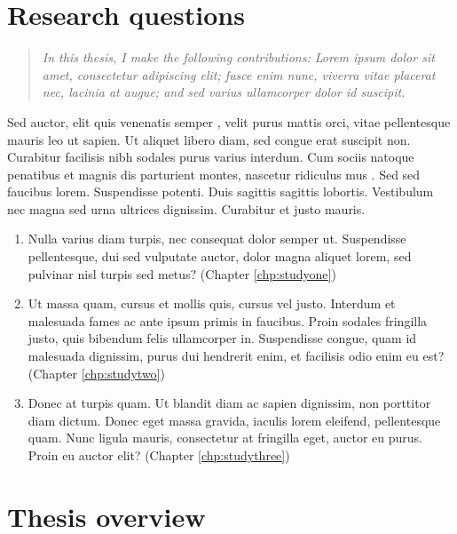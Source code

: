 \section{Research questions}

\begin{quote}\itshape In this thesis, I make the following contributions:
Lorem ipsum dolor sit amet, consectetur adipiscing elit; fusce enim nunc,
viverra vitae placerat nec, lacinia at augue; and sed varius ullamcorper dolor
id suscipit.\end{quote}

Sed auctor, elit quis venenatis semper \cite{Anderson2005}, velit purus
mattis orci, vitae pellentesque mauris leo ut sapien.  Ut aliquet libero
diam, sed congue erat suscipit non.  Curabitur facilisis nibh sodales purus
varius interdum.  Cum sociis natoque penatibus et magnis dis parturient
montes, nascetur ridiculus mus \cite{Morgan2002}.  Sed sed faucibus lorem.  Suspendisse
potenti.  Duis sagittis sagittis lobortis.  Vestibulum nec magna sed urna
ultrices dignissim.  Curabitur et justo mauris.

\begin{enumerate}

\item Nulla varius diam turpis, nec consequat dolor semper ut. Suspendisse
pellentesque, dui sed vulputate auctor, dolor magna aliquet lorem, sed
pulvinar nisl turpis sed metus?  (Chapter \ref{chp:studyone})

\item Ut massa quam, cursus et mollis quis, cursus vel justo.  Interdum et
malesuada fames ac ante ipsum primis in faucibus.  Proin sodales fringilla
justo, quis bibendum felis ullamcorper in.  Suspendisse congue, quam id
malesuada dignissim, purus dui hendrerit enim, et facilisis odio enim eu
est?  (Chapter \ref{chp:studytwo})

\item Donec at turpis quam. Ut blandit diam ac
sapien dignissim, non porttitor diam dictum. Donec eget massa gravida,
iaculis lorem eleifend, pellentesque quam. Nunc ligula mauris, consectetur
at fringilla eget, auctor eu purus. Proin eu auctor elit? (Chapter
\ref{chp:studythree})

\end{enumerate}

\section{Thesis overview}

